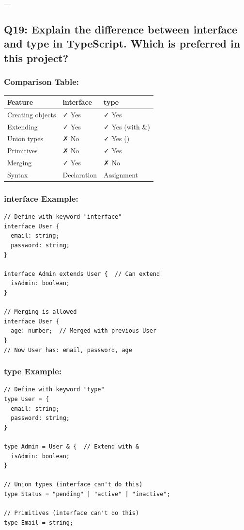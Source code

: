 \documentclass[12pt]{article}
\begin{document}
---

\subsection{Q19: Explain the difference between interface and type in TypeScript. Which is preferred in this project?}

\subsubsection*{Comparison Table:}

\begin{center}
\begin{tabular}{|l|l|l|}
\hline
\textbf{Feature} & \textbf{interface} & \textbf{type} \\
\hline
Creating objects & ✓ Yes & ✓ Yes \\
Extending & ✓ Yes & ✓ Yes (with \&) \\
Union types & ✗ No & ✓ Yes (\textbar{}) \\
Primitives & ✗ No & ✓ Yes \\
Merging & ✓ Yes & ✗ No \\
Syntax & Declaration & Assignment \\
\hline
\end{tabular}
\end{center}

\subsubsection*{interface Example:}

\begin{lstlisting}
// Define with keyword "interface"
interface User {
  email: string;
  password: string;
}

interface Admin extends User {  // Can extend
  isAdmin: boolean;
}

// Merging is allowed
interface User {
  age: number;  // Merged with previous User
}
// Now User has: email, password, age
\end{lstlisting}

\subsubsection*{type Example:}

\begin{lstlisting}
// Define with keyword "type"
type User = {
  email: string;
  password: string;
}

type Admin = User & {  // Extend with &
  isAdmin: boolean;
}

// Union types (interface can't do this)
type Status = "pending" | "active" | "inactive";

// Primitives (interface can't do this)
type Email = string;
\end{lstlisting}
\end{document}
